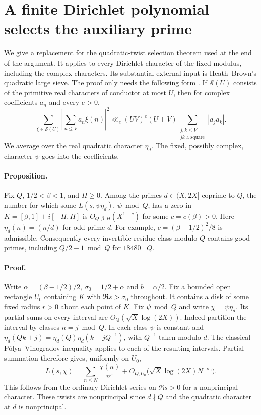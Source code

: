 \section{A finite Dirichlet polynomial selects the auxiliary prime}
\label{sec:analyticsieve}
We give a replacement for the quadratic-twist selection theorem used at the end of the argument. It applies to every Dirichlet character of the fixed modulus, including the complex characters. Its substantial external input is Heath--Brown's quadratic large sieve. The proof only needs the following form \cite[Corollary~2]{HB}. If $\mathcal{S}(U)$ consists of the primitive real characters of conductor at most $U$, then for complex coefficients $a_n$ and every $e>0$,
\begin{equation}\label{eq:hbsieve}
 \sum_{\xi\in\mathcal{S}(U)}\left|\sum_{n\le V}a_n\xi(n)\right|^2
 \ll_e (UV)^e(U+V)\!\sum_{\substack{j,k\le V\\jk\text{ a square}}}|a_j a_k|.
\end{equation}
We average over the real quadratic character $\eta_d$. The fixed, possibly complex, character $\psi$ goes into the coefficients.

\paragraph{Proposition.} Fix $Q$, $1/2<\beta<1$, and $H\ge0$. Among the primes $d\in(X,2X]$ coprime to $Q$, the number for which some $L(s,\psi\eta_d)$, $\psi\bmod Q$, has a zero in $K=[\beta,1]+i[-H,H]$ is $O_{Q,\beta,H}(X^{1-c})$ for some $c=c(\beta)>0$. Here $\eta_d(n)=(n/d)$ for odd prime $d$. For example, $c=(\beta-1/2)^2/8$ is admissible. Consequently every invertible residue class modulo $Q$ contains good primes, including $Q/2-1\bmod Q$ for $18480\mid Q$.

\paragraph{Proof.} Write $\alpha=(\beta-1/2)/2$, $\sigma_0=1/2+\alpha$ and $b=\alpha/2$. Fix a bounded open rectangle $U_0$ containing $K$ with $\Re s>\sigma_0$ throughout. It contains a disk of some fixed radius $r>0$ about each point of $K$. Fix $\psi\bmod Q$ and write $\chi=\psi\eta_d$. Its partial sums on every interval are $O_Q(\sqrt X\log(2X))$. Indeed partition the interval by classes $n=j\bmod Q$. In each class $\psi$ is constant and $\eta_d(Qk+j)=\eta_d(Q)\eta_d(k+jQ^{-1})$, with $Q^{-1}$ taken modulo $d$. The classical P\'olya--Vinogradov inequality applies to each of the resulting intervals. Partial summation therefore gives, uniformly on $U_0$,
\[
 L(s,\chi)=\sum_{n\le N}\frac{\chi(n)}{n^s}
     +O_{Q,U_0}\big(\sqrt X\log(2X)N^{-\sigma_0}\big).
\]
This follows from the ordinary Dirichlet series on $\Re s>0$ for a nonprincipal character. These twists are nonprincipal since $d\nmid Q$ and the quadratic character at $d$ is nonprincipal.

